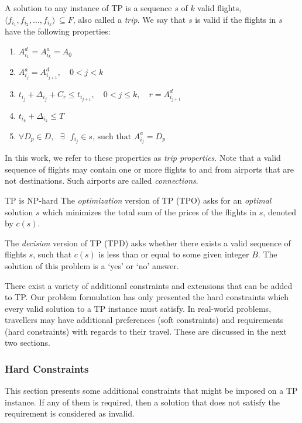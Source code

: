 \documentclass{mpaper}
\begin{document}
A solution to any instance of TP is a sequence $s$ of $k$ valid flights, $ \langle f_{i_{1}}, f_{i_{2}},...,f_{i_{k}} \rangle \, \subseteq F$, also called a \textit{trip}. We say that $s$ is valid if the flights in $s$ have the following properties:

\begin{enumerate}
\item $A^{d}_{i_{1}} = A^{a}_{i_{k}} = A_{0}$
\item $ A^{a}_{i_{j}} = A^{d}_{i_{j+1}},  \quad 0 < j < k$
\item $ t_{i_{j}} + \Delta_{i_{j}} + C_{r} \leq t_{i_{j+1}}, \quad 0 < j \leq k, \quad r = A^{d}_{i_{j+1}}$
\item $t_{i_{k}} + \Delta_{i_{k}} \leq T$
\item $ \forall D_{p} \in D, \textrm{ } \exists \textrm{ } f_{i_{j}} \in s \textrm{, such that } A^{a}_{i_{j}} = D_{p} $
\end{enumerate}

In this work, we refer to these properties as \textit{trip properties}. Note that a valid sequence of flights may contain one or more flights to and from airports that are not destinations. Such airports are called \textit{connections}.

TP is NP-hard 
The \textit{optimization} version of TP (TPO) asks for an \textit{optimal} solution $s$ which minimizes the total sum of the prices of the flights in $s$, denoted by $c(s)$.

The \textit{decision} version of TP (TPD) asks whether there exists a valid sequence of flights $s$, such that $c(s)$ is less than or equal to some given integer $B$. The solution of this problem is a `yes' or `no' answer.

There exist a variety of additional constraints and extensions that can be added to TP. Our problem formulation has only presented the hard constraints which every valid solution to a TP instance must satisfy. In real-world problems, travellers may have additional preferences (soft constraints) and requirements (hard constraints) with regards to their travel. These are discussed in the next two sections.

\subsubsection{Hard Constraints}
\label{subsec:hardconstraints}
This section presents some additional constraints that might be imposed on a TP instance. If any of them is required, then a solution that does not satisfy the requirement is considered as invalid.
\end{document}
